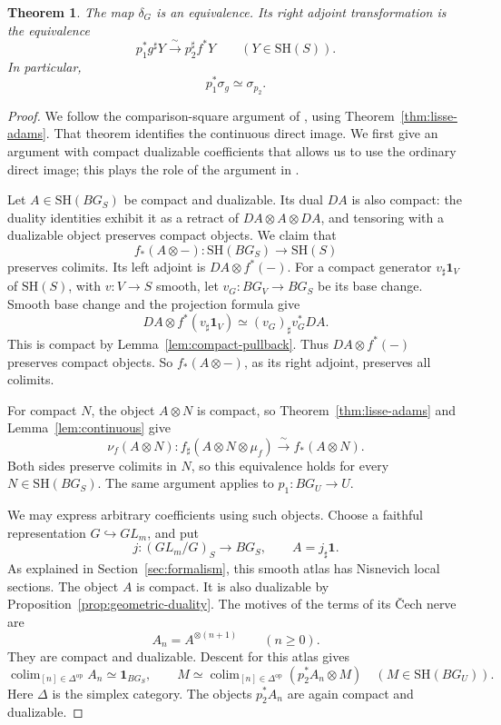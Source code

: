 \documentclass[11pt,reqno]{amsart}
\newtheorem{theorem}{Theorem}[section]
\theoremstyle{definition}
\theoremstyle{remark}
\theoremstyle{plain}
\numberwithin{equation}{section}
\newcommand{\SH}{\mathrm{SH}}
\newcommand{\one}{\mathbf 1}
\DeclareMathOperator*{\colim}{colim}
\begin{document}
\begin{theorem}\label{thm:mixed-exchange}
The map \(\delta_G\) is an equivalence.
Its right adjoint transformation is the equivalence
\[
 p_1^*g^\sharp Y\xrightarrow{\ \sim\ }p_2^\sharp f^*Y
 \qquad(Y\in\SH(S)).
\]
In particular,
\[
 p_1^*\sigma_g\simeq\sigma_{p_2}.
\]
\end{theorem}
\begin{proof}
We follow the comparison-square argument of
\cite[Proposition~6.13]{GH}, using Theorem~\ref{thm:lisse-adams}.
That theorem identifies the continuous direct image. We first give
an argument with compact dualizable coefficients that allows us to
use the ordinary direct image; this plays the role of the argument
in \cite[Lemma~6.14]{GH}.

Let \(A\in\SH(BG_S)\) be compact and dualizable.
Its dual \(DA\) is also compact: the duality identities exhibit it
as a retract of \(DA\otimes A\otimes DA\), and tensoring with a
dualizable object preserves compact objects.
We claim that
\[
 f_*(A\otimes-):\SH(BG_S)\longrightarrow\SH(S)
\]
preserves colimits.
Its left adjoint is \(DA\otimes f^*(-)\).
For a compact generator \(v_\sharp\one_V\) of \(\SH(S)\), with
\(v:V\to S\) smooth, let \(v_G:BG_V\to BG_S\) be its base change.
Smooth base change and the projection formula give
\[
 DA\otimes f^*(v_\sharp\one_V)
 \simeq (v_G)_\sharp v_G^*DA.
\]
This is compact by Lemma~\ref{lem:compact-pullback}.
Thus \(DA\otimes f^*(-)\) preserves compact objects. 
So \(f_*(A\otimes-)\), as its right adjoint, preserves all colimits.

For compact \(N\), the object \(A\otimes N\) is compact, so
Theorem~\ref{thm:lisse-adams} and Lemma~\ref{lem:continuous} give
\begin{equation}\label{eq:mixed-supported-adams}
 \nu_f(A\otimes N):
 f_\sharp(A\otimes N\otimes\mu_f)
 \xrightarrow{\ \sim\ }f_*(A\otimes N).
\end{equation}
Both sides preserve colimits in \(N\), so this equivalence holds
for every \(N\in\SH(BG_S)\).
The same argument applies to \(p_1:BG_U\to U\).

We may express arbitrary coefficients using such objects.
Choose a faithful representation \(G\hookrightarrow GL_m\), and put
\[
 j:(GL_m/G)_S\longrightarrow BG_S,\qquad A=j_\sharp\one.
\]
As explained in Section~\ref{sec:formalism}, this smooth atlas has
Nisnevich local sections. The object \(A\) is compact.
It is also dualizable by Proposition~\ref{prop:geometric-duality}.
The motives of the terms of its \v{C}ech nerve are
\[
 A_n=A^{\otimes(n+1)}\qquad(n\geq0).
\]
They are compact and dualizable. Descent for this atlas gives
\begin{equation}\label{eq:mixed-cech}
 \colim_{[n]\in\Delta^{\mathrm{op}}}A_n\simeq\one_{BG_S},
 \qquad
 M\simeq\colim_{[n]\in\Delta^{\mathrm{op}}}
       (p_2^*A_n\otimes M)
 \quad(M\in\SH(BG_U)).
\end{equation}
Here \(\Delta\) is the simplex category.
The objects \(p_2^*A_n\) are again compact and dualizable.


\end{proof}
\end{document}
